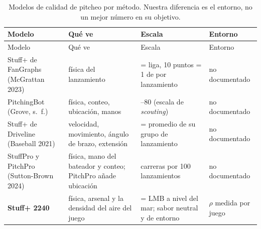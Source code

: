 \documentclass[
  english,
  spanish,
  10pt,
  letterpaper,
]{article}
\begin{document}
\begin{longtable}[]{@{}
  >{\raggedright\arraybackslash}p{}
  >{\raggedright\arraybackslash}p{}
  >{\raggedright\arraybackslash}p{}
  >{\raggedright\arraybackslash}p{}@{}}
\caption{Modelos de calidad de pitcheo por método. Nuestra diferencia es
el entorno, no un mejor número en su objetivo.}\tabularnewline
\toprule\noalign{}
\begin{minipage}[b]{\linewidth}\raggedright
Modelo
\end{minipage} & \begin{minipage}[b]{\linewidth}\raggedright
Qué ve
\end{minipage} & \begin{minipage}[b]{\linewidth}\raggedright
Escala
\end{minipage} & \begin{minipage}[b]{\linewidth}\raggedright
Entorno
\end{minipage} \\
\midrule\noalign{}
\endfirsthead
\toprule\noalign{}
\begin{minipage}[b]{\linewidth}\raggedright
Modelo
\end{minipage} & \begin{minipage}[b]{\linewidth}\raggedright
Qué ve
\end{minipage} & \begin{minipage}[b]{\linewidth}\raggedright
Escala
\end{minipage} & \begin{minipage}[b]{\linewidth}\raggedright
Entorno
\end{minipage} \\
\midrule\noalign{}
\endhead
\bottomrule\noalign{}
\endlastfoot
Stuff+ de FanGraphs (McGrattan 2023) & física del lanzamiento & 100 =
liga, 10 puntos = 1 de por lanzamiento & no documentado \\
PitchingBot (Grove, s.~f.) & física, conteo, ubicación, manos & 20--80
(escala de \emph{scouting}) & no documentado \\
Stuff+ de Driveline (Baseball 2021) & velocidad, movimiento, ángulo de
brazo, extensión & 100 = promedio de su grupo de lanzamiento & no
documentado \\
StuffPro y PitchPro (Sutton-Brown 2024) & física, mano del bateador y
conteo; PitchPro añade ubicación & carreras por 100 lanzamientos & no
documentado \\
\textbf{Stuff+ 2240} & física, arsenal y la densidad del aire del juego
& 100 = LMB a nivel del mar; sabor neutral y de entorno & \(\rho\)
medida por juego \\
\end{longtable}
\end{document}

